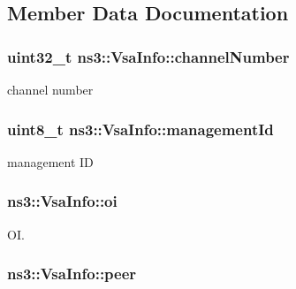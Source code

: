 \subsection{Member Data Documentation}
\subsubsection[{\texorpdfstring{channel\+Number}{channelNumber}}]{\setlength{\rightskip}{0pt plus 5cm}uint32\+\_\+t ns3\+::\+Vsa\+Info\+::channel\+Number}\hypertarget{structns3_1_1VsaInfo_a72af25993c262cb6454afa073b0e1ab6}{}\label{structns3_1_1VsaInfo_a72af25993c262cb6454afa073b0e1ab6}


channel number 

\subsubsection[{\texorpdfstring{management\+Id}{managementId}}]{\setlength{\rightskip}{0pt plus 5cm}uint8\+\_\+t ns3\+::\+Vsa\+Info\+::management\+Id}\hypertarget{structns3_1_1VsaInfo_a0cb57fcddf16cf49780e580e9bbca452}{}\label{structns3_1_1VsaInfo_a0cb57fcddf16cf49780e580e9bbca452}


management ID 

\subsubsection[{\texorpdfstring{oi}{oi}}]{ ns3\+::\+Vsa\+Info\+::oi}\hypertarget{structns3_1_1VsaInfo_ade76bfaa8bd17d73c52dd88764511d2f}{}\label{structns3_1_1VsaInfo_ade76bfaa8bd17d73c52dd88764511d2f}


OI. 

\subsubsection[{\texorpdfstring{peer}{peer}}]{ ns3\+::\+Vsa\+Info\+::peer}\hypertarget{structns3_1_1VsaInfo_a9aabfb3896a3bff488a870c6ed42bc39}{}\label{structns3_1_1VsaInfo_a9aabfb3896a3bff488a870c6ed42bc39}


